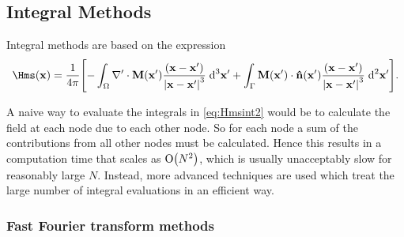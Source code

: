 \subsection{Integral Methods}
\label{sec:magstat-field-calc-inte}



Integral methods are based on the expression
\begin{equation}
  \Hms(\xv) = \frac{1}{4 \pi} \bigs{
    - \int_\magd \nabla' \cdot \Mv(\xv') \frac{(\xv - \xv')}{\abs{\xv -\xv'}^3} \d^3 \xv'
    + \int_\boundd \Mv(\xv') \cdot \nv(\xv') \frac{(\xv - \xv')}{\abs{\xv - \xv'}^3} \d^2 \xv' }.
  \label{eq:Hmsint2}
\end{equation}

A naive way to evaluate the integrals in \cref{eq:Hmsint2} would be to calculate the field at each node due to each other node.
So for each node a sum of the contributions from all other nodes must be calculated.
Hence this results in a computation time that scales as $\mathrm{O}{\left( N^2 \right)}$, which is usually unacceptably slow for reasonably large $N$.
Instead, more advanced techniques are used which treat the large number of integral evaluations in an efficient way.


\subsubsection{Fast Fourier transform methods}

